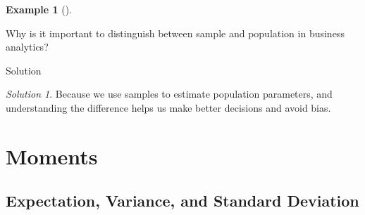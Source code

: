 \documentclass[
  12pt,
  letterpaper,
]{scrbook}
\theoremstyle{plain}
\theoremstyle{definition}
\newtheorem{example}{Example}[chapter]
\theoremstyle{remark}
\newtheorem{refsolution}{Solution}[chapter]
\begin{document}
\begin{example}[]\protect\hypertarget{exm-3}{}\label{exm-3}

Why is it important to distinguish between sample and population in
business analytics?

\end{example}

Solution

\begin{refsolution}
\leavevmode

Because we use samples to estimate population parameters, and
understanding the difference helps us make better decisions and avoid
bias.

\label{sol-3}

\end{refsolution}

\section{Moments}\label{moments}

\subsection{Expectation, Variance, and Standard
Deviation}\label{expectation-variance-and-standard-deviation}
\end{document}
